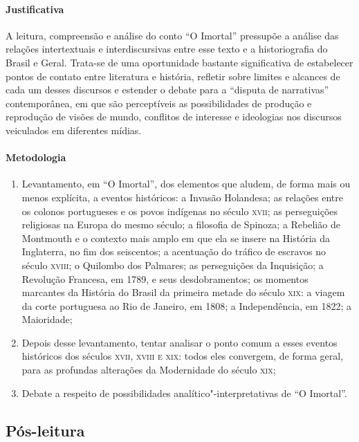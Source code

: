\documentclass{extarticle}
\begin{document}
\paragraph{Justificativa} A leitura, compreensão e análise do conto ``O
Imortal'' pressupõe a análise das relações intertextuais e
interdiscursivas entre esse texto e a historiografia do Brasil e Geral.
Trata-se de uma oportunidade bastante significativa de estabelecer
pontos de contato entre literatura e história, refletir sobre limites e
alcances de cada um desses discursos e estender o debate para a
``disputa de narrativas'' contemporânea, em que são perceptíveis as
possibilidades de produção e reprodução de visões de mundo, conflitos de
interesse e ideologias nos discursos veiculados em diferentes mídias.

\paragraph{Metodologia}
\begin{enumerate}
\item Levantamento, em ``O Imortal'', dos elementos que aludem, de forma
mais ou menos explícita, a eventos históricos: a Invasão Holandesa; as
relações entre os colonos portugueses e os povos indígenas no século
\textsc{xvii}; as perseguições religiosas na Europa do mesmo século; a filosofia
de Spinoza; a Rebelião de Montmouth e o contexto mais amplo em que ela
se insere na História da Inglaterra, no fim dos seiscentos; a acentuação
do tráfico de escravos no século \textsc{xviii}; o Quilombo dos Palmares; as
perseguições da Inquisição; a Revolução Francesa, em 1789, e seus
desdobramentos; os momentos marcantes da História do Brasil da primeira
metade do século \textsc{xix}: a viagem da corte portuguesa ao Rio de Janeiro, em
1808; a Independência, em 1822; a Maioridade;

\item Depois desse levantamento, tentar analisar o ponto comum a esses
eventos históricos dos séculos \textsc{xvii, xviii e xix}: todos eles convergem,
de forma geral, para as profundas alterações da Modernidade do século
\textsc{xix};

\item Debate a respeito de possibilidades analítico"-interpretativas de ``O
Imortal''.
\end{enumerate}

\subsection{Pós-leitura}
\end{document}
